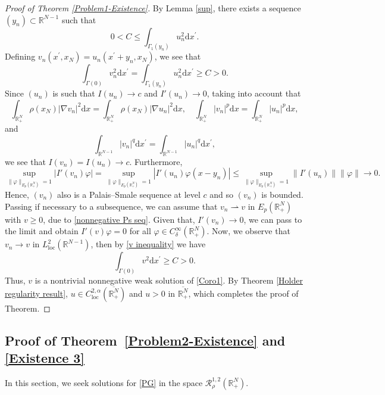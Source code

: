 \documentclass[12pt,reqno]{amsart}
\begin{document}
\begin{proof}[Proof of Theorem \ref{Problem1-Existence}] By Lemma \ref{sup}, there exists a sequence $(y_n)\subset \mathds{R}^{N-1}$ such that
\begin{equation*}
0<C\leq\int_{\Gamma_1(y_n)}u_n^2\mathrm{d}x^\prime.
\end{equation*}
Defining $v_n(x^\prime,x_N)=u_n(x^\prime+y_n,x_N)$, we see that 
\begin{equation}\label{v inequality}
\int_{\Gamma(0)}v_n^2\mathrm{d}x^\prime=\int_{\Gamma_1(y_n)}u_n^2 \mathrm{d}x^\prime\geq C>0.
\end{equation}
Since $(u_n)$ is such that $I(u_n)\longrightarrow c$ and $I'(u_n)\longrightarrow 0$, taking into account that  
\[
\int_{\mathds{R}^N_+}\rho(x_N)|\nabla v_n|^2\mathrm{d}x=\int_{\mathds{R}^N_+}\rho(x_N)|\nabla u_n|^2\mathrm{d}x,\quad \int_{\mathds{R}^N_+}|v_n|^p\mathrm{d}x= \int_{\mathds{R}^N_+}|u_n|^p\mathrm{d}x,
\]
and
\[
\int_{\mathds{R}^{N-1}}|v_n|^q\mathrm{d}x^\prime= \int_{\mathds{R}^{N-1}}|u_n|^q\mathrm{d}x^\prime,
\]
we see that  $I(v_n)=I(u_n)\longrightarrow c$. Furthermore,
\[
\sup_{\|\varphi\|_{E_p(\mathds{R}^N_+)} =1 }|I'(v_n)\varphi|=\sup_{\|\varphi\|_{E_p(\mathds{R}^N_+)} =1}|I'(u_n)\varphi(x-y_n)|\leq \sup_{\|\varphi\|_{E_p(\mathds{R}^N_+)} =1}\|I'(u_n)\|\|\varphi\|\longrightarrow 0.
\]
Hence, $(v_n)$ also is a Palais–Smale sequence at level $c$ and so $(v_n)$ is bounded. Passing if necessary to a subsequence, we can assume that $v_n\rightharpoonup v$ in $E_p(\mathds{R}^N_+)$ with $v\geq 0$, due to \eqref{nonnegative Ps seq}. Given that, $I'(v_n)\longrightarrow 0$, we can pass to the limit and obtain $I'(v)\varphi =0$ for all $\varphi \in C^\infty_\delta(\mathds{R}^N_+)$. Now, we observe that $v_n\longrightarrow v$ in $L^2_\mathrm{loc}(\mathds{R}^{N-1})$, then by \eqref{v inequality} we have
\[
\int_{\Gamma(0)}v^2\mathrm{d}x^\prime\geq C>0.
\]
Thus, $v$ is a nontrivial nonnegative weak solution of \eqref{Coro1}. By Theorem \ref{Holder regularity result}, $u\in C^{2,\alpha}_{\mathrm{loc}}(\overline{\mathds{R}^N_+})$ and $u > 0$ in $\overline{\mathds{R}^N_+}$, which completes the proof of Theorem.
\end{proof}

\subsection{Proof of Theorem~\ref{Problem2-Existence} and \ref{Existence 3}}

In this section, we seek solutions for \eqref{PG} in the space $\mathcal{R}^{1,2}_\rho(\mathds{R}^N_+)$.
\end{document}
